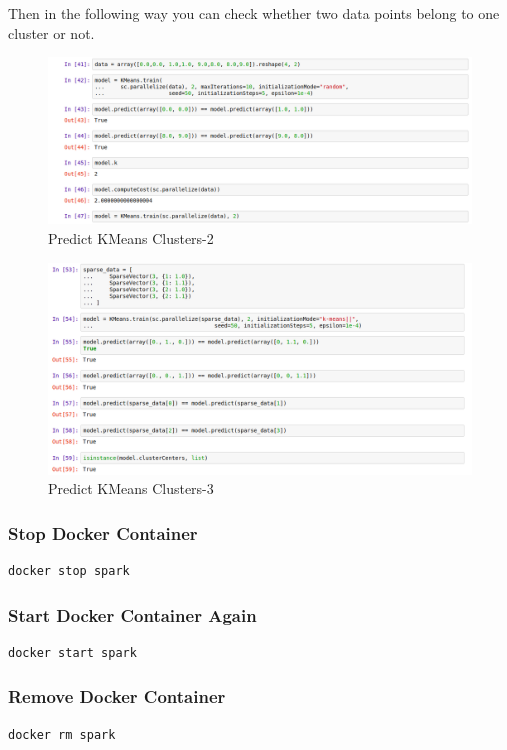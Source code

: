 Then in the following way you can check whether two data points belong
to one cluster or not.

\begin{figure}[htbp]
\centering
\includegraphics[width=1.0\textwidth]{images/docker-spark-tut-2.png}
\caption{Predict KMeans Clusters-2}
\end{figure}
 
\begin{figure}[htbp]
\centering
\includegraphics[width=1.0\textwidth]{images/docker-spark-tut-3.png}
\caption{Predict KMeans Clusters-3}
\end{figure}

\subsubsection{Stop Docker Container}

\begin{lstlisting}
docker stop spark
\end{lstlisting}

\subsubsection{Start Docker Container
Again}

\begin{lstlisting}
docker start spark
\end{lstlisting}

\subsubsection{Remove Docker Container}

\begin{lstlisting}
docker rm spark
\end{lstlisting}